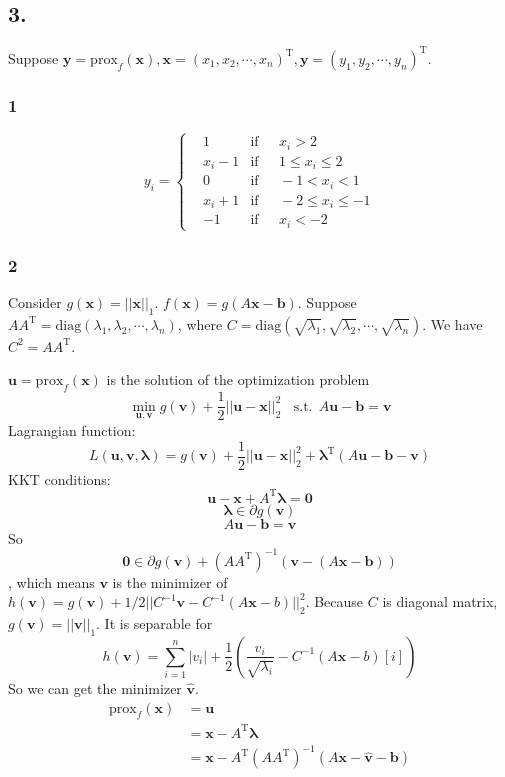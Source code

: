 \documentclass{article}
\begin{document}
\subsection*{3.}


Suppose $\bm{y}=\mathrm{prox}_{f}(\bm{x}),\bm{x}=(x_{1},x_{2},\cdots ,x_{n})^{\mathrm{T}},\bm{y}=(y_{1},y_{2},\cdots , y_{n})^{\mathrm{T}}$.
\subsubsection*{1}

$$y_{i}=\left\{
\begin{aligned}
&1& \mathrm{if}&\ \ \  x_{i}> 2\\
&x_{i}-1 & \mathrm{if}&\ \ \  1\leq x_{i}\leq2\\
&0& \mathrm{if}&\ \ \  -1<x_{i}<1\\
&x_{i}+1 & \mathrm{if}&\ \ \  -2 \leq x_{i}\leq-1\\
&-1 & \mathrm{if}&\ \ \  x_{i}<-2
\end{aligned}
\right.
$$
\subsubsection*{2}
Consider $g(\bm{x})=||\bm{x}||_{1}$. $f(\bm{x})=g(A\bm{x}-\bm{b})$. Suppose $AA^{\mathrm{T}}=\mathrm{diag}(\lambda_{1},\lambda_{2},\cdots,\lambda_{n})$, where $C=\mathrm{diag}(\sqrt{\lambda_{1}},\sqrt{\lambda_{2}},\cdots,\sqrt{\lambda_{n}})$. We have $C^{2}=AA^{\mathrm{T}}$.

$\bm{u}=\mathrm{prox}_{f}(\bm{x})$ is the solution of the optimization problem
$$\min_{\bm{u},\bm{v}}g(\bm{v})+\frac{1}{2}||\bm{u}-\bm{x}||_{2}^{2} \ \ \ \ \mathrm{s.t.}\ \ A\bm{u}-\bm{b}=\bm{v}$$
Lagrangian function: $$L(\bm{u},\bm{v},\bm{\lambda})= g(\bm{v})+\frac{1}{2}||\bm{u}-\bm{x}||_{2}^{2}+\bm{\lambda}^{\mathrm{T}}(A\bm{u}-\bm{b}-\bm{v})$$
KKT conditions:
$$\bm{u}-\bm{x}+A^{\mathrm{T}}\bm{\lambda}=\bm{0}$$
$$\bm{\lambda}\in \partial g(\bm{v})$$
$$A\bm{u}-\bm{b}=\bm{v}$$
So $$\bm{0}\in \partial g(\bm{v})+(AA^{\mathrm{T}})^{-1}(\bm{v}-(A\bm{x}-\bm{b}))$$,
which means $\bm{v}$ is the minimizer of $h(\bm{v})=g(\bm{v})+1/2||C^{-1}\bm{v}-C^{-1}(A\bm{x}-b)||^{2}_{2}$.
Because $C$ is diagonal matrix, $g(\bm{v})=||\bm{v}||_{1}$. It is separable for $$h(\bm{v})=\sum_{i=1}^{n}|v_{i}|+\frac{1}{2}(\frac{v_{i}}{\sqrt{\lambda_{i}}}-C^{-1}(A\bm{x}-b)[i])$$
So we can get the minimizer $\hat{\bm{v}}$.
\begin{align*}
\mathrm{prox}_{f}(\bm{x})&=\bm{u}\\
&=\bm{x}-A^{\mathrm{T}}\bm{\lambda}\\
&=\bm{x}-A^{\mathrm{T}}(AA^{\mathrm{T}})^{-1}(A\bm{x}-\hat{\bm{v}}-\bm{b})
\end{align*}
\end{document}
